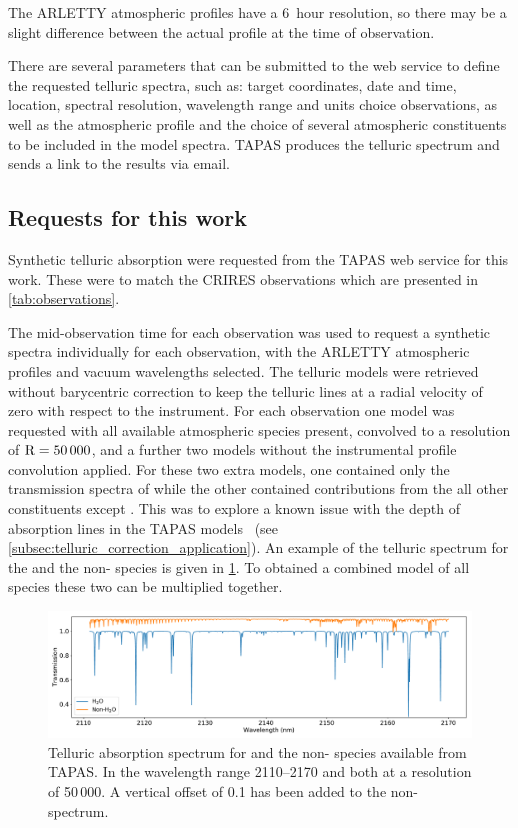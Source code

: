 The {ARLETTY} atmospheric profiles have a 6~hour resolution, so there may be a slight difference between the actual profile at the time of observation.

There are several parameters that can be submitted to the web service to define the requested telluric spectra, such as: target coordinates, date and time, location, spectral resolution, wavelength range and units choice observations, as well as the atmospheric profile and the choice of several atmospheric constituents to be included in the model spectra. {TAPAS} produces the telluric spectrum and sends a link to the results via email.


\subsection{Requests for this work}
Synthetic telluric absorption were requested from the {TAPAS} web service for this work.
These were to match the {CRIRES} observations which are presented in \cref{tab:observations}.

The mid-observation time for each observation was used to request a synthetic spectra individually for each observation, with the {ARLETTY} atmospheric profiles and vacuum wavelengths selected.
The telluric models were retrieved without barycentric correction to keep the telluric lines at a radial velocity of zero with respect to the instrument.
For each observation one model was requested with all available atmospheric species present, convolved to a resolution of \(\rm R=50\,000\), and a further two models without the instrumental profile convolution applied.
For these two extra models, one contained only the transmission spectra of  while the other contained contributions from the all other constituents except .
This was to explore a known issue with the depth of  absorption lines in the {TAPAS} models~\citet{bertaux_tapas_2014} (see \cref{subsec:telluric_correction_application}).
An example of the telluric spectrum for the  and the non- species is given in \cref{fig:telluriccomponents}. To obtained a combined model of all species these two can be multiplied together.

\begin{figure}
    \centering
    \includegraphics[width=0.9\linewidth]{figures/atmos_and_models/telluric_components}
    \caption[Telluric spectra for the  and non- species.]{Telluric absorption spectrum for  and the non- species available from {TAPAS}. In the wavelength range 2110--2170\nm{} and both at a resolution of 50\,000. A vertical offset of 0.1 has been added to the non- spectrum.}
    \label{fig:telluriccomponents}
\end{figure}


